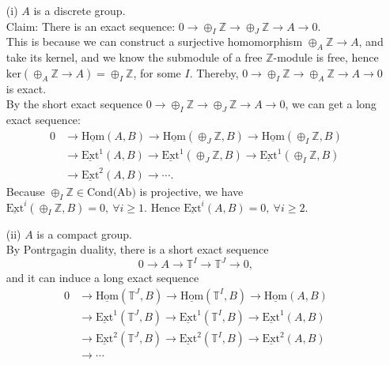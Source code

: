 \documentclass[UTF8,12,a4paper]{ctexart}
\theoremstyle{definition}
\begin{document}
\begin{itemize}
	\item [(i)] $A$ is a discrete group.\\
	Claim: There is an exact sequence: $0\to \oplus_I\mathbb{Z} \to \oplus_J\mathbb{Z}\to A\to 0.$\\
	This is because we can construct a surjective homomorphism $\oplus_A \mathbb{Z}\to A$, and take its kernel, and we know the submodule of a free $\mathbb{Z}$-module is free, hence $\text{ker}(\oplus_A \mathbb{Z}\to A)=\oplus_I \mathbb{Z}$, for some $I$. Thereby, $0\to \oplus_I\mathbb{Z} \to \oplus_A\mathbb{Z}\to A\to 0$ is exact.\\
	By the short exact sequence $0\to \oplus_I\mathbb{Z} \to \oplus_J\mathbb{Z}\to A\to 0$, we can get a long exact sequence:
	\begin{align*}
	0&\longrightarrow \underline{\text{Hom}}(A,B)\longrightarrow \underline{\text{Hom}}(\oplus_J\mathbb{Z},B)\longrightarrow \underline{\text{Hom}}(\oplus_I\mathbb{Z},B)\\
	&\longrightarrow \underline{\text{Ext}}^1(A,B)\longrightarrow \underline{\text{Ext}}^1(\oplus_J\mathbb{Z},B)\longrightarrow \underline{\text{Ext}}^1(\oplus_I\mathbb{Z},B)\\
	&\longrightarrow \underline{\text{Ext}}^2(A,B)\longrightarrow \cdots.
	\end{align*}
	Because $\oplus_I\mathbb{Z}\in \text{Cond(Ab)}$ is projective, we have $\underline{\text{Ext}}^i(\oplus_I\mathbb{Z},B)=0,\ \forall i\geq 1.$ Hence $\underline{\text{Ext}}^i(A,B)=0,\ \forall i\geq 2.$
	\item [(ii)] $A$ is a compact group.\\
	By Pontrgagin duality, there is a short exact sequence
	$$0\rightarrow A\rightarrow \mathbb{T}^I\rightarrow \mathbb{T}^J\rightarrow 0,$$ and it can induce a long exact sequence
	\begin{align*}
	0&\longrightarrow \underline{\text{Hom}}(\mathbb{T}^J,B)\longrightarrow \underline{\text{Hom}}(\mathbb{T}^I,B)\longrightarrow \underline{\text{Hom}}(A,B)\\
	&\longrightarrow \underline{\text{Ext}}^1(\mathbb{T}^J,B)\longrightarrow \underline{\text{Ext}}^1(\mathbb{T}^I,B)\longrightarrow \underline{\text{Ext}}^1(A,B)\\
	&\longrightarrow \underline{\text{Ext}}^2(\mathbb{T}^J,B)\longrightarrow \underline{\text{Ext}}^2(\mathbb{T}^I,B)\longrightarrow
	\underline{\text{Ext}}^2(A,B)\\
	&\longrightarrow\cdots
	\end{align*}

\end{itemize}
\end{document}

